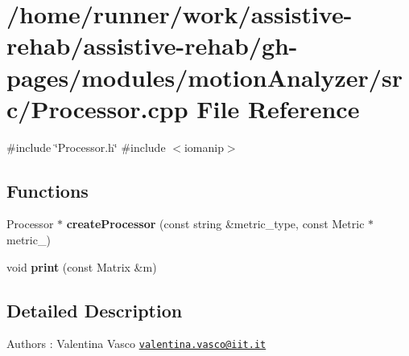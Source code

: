 \section{/home/runner/work/assistive-\/rehab/assistive-\/rehab/gh-\/pages/modules/motion\+Analyzer/src/\+Processor.cpp File Reference}
\label{Processor_8cpp}
{\ttfamily \#include \char`\"{}Processor.\+h\char`\"{}}\newline
{\ttfamily \#include $<$iomanip$>$}\newline
\subsection*{Functions}
\begin{DoxyCompactItemize}
\item 
\mbox{\label{Processor_8cpp_a9f00bd3632d3c6070e667213c2d75aa6}} 
Processor $\ast$ {\bfseries create\+Processor} (const string \&metric\+\_\+type, const Metric $\ast$metric\+\_\+)
\item 
\mbox{\label{Processor_8cpp_a9ed8164d10bb492e02ff6bad278676ee}} 
void {\bfseries print} (const Matrix \&m)
\end{DoxyCompactItemize}


\subsection{Detailed Description}
\begin{DoxyAuthor}{Authors}
\+: Valentina Vasco \href{mailto:valentina.vasco@iit.it}{\tt valentina.\+vasco@iit.\+it} 
\end{DoxyAuthor}
